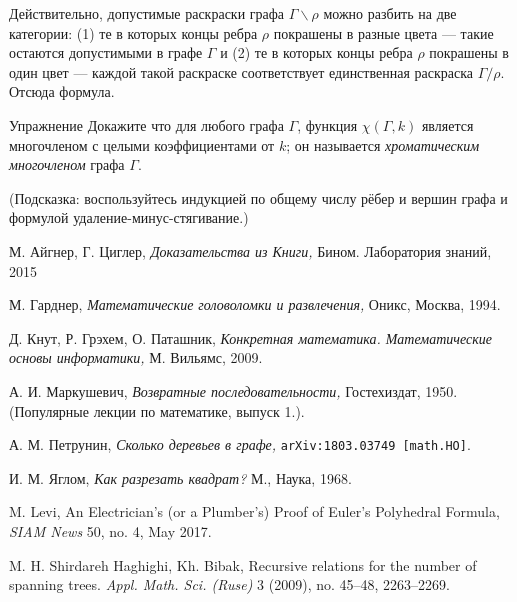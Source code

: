 \documentclass{article}
\begin{document}
Действительно, допустимые раскраски графа $\Gamma\backslash\rho$ можно разбить на две категории: (1) те в которых концы ребра $\rho$ покрашены в разные цвета --- такие остаются допустимыми в графе $\Gamma$ и (2) те в которых концы ребра $\rho$ покрашены в один цвет --- каждой такой раскраске соответствует единственная раскраска $\Gamma/\rho$.
Отсюда формула.

\begin{thm}{Упражнение}
Докажите что для любого графа $\Gamma$, функция $\chi(\Gamma,k)$ является многочленом с целыми коэффициентами от $k$;
он называется \emph{хроматическим многочленом} графа $\Gamma$.

(Подсказка: воспользуйтесь индукцией по общему числу рёбер и вершин графа и формулой удаление-минус-стягивание.)
\end{thm}

\begin{thebibliography}{52}

 М. Айгнер, Г. Циглер, 
\emph{Доказательства из Книги,} 
Бином. Лаборатория знаний, 2015 

 М. Гарднер, \emph{Математические головоломки и развлечения,}  Оникс, Москва, 1994.

Д. Кнут, Р. Грэхем, О. Паташник,
\emph{Конкретная математика. Математические основы информатики,}
М. Вильямс, 
2009.

А. И. Маркушевич,
\emph{Возвратные последовательности,} 
Гостехиздат, 1950. 
(Популярные лекции по математике, выпуск 1.).

 А. М. Петрунин,
\emph{Сколько деревьев в графе,}
\texttt{arXiv:1803.03749 [math.HO]}.

И. М. Яглом,
\emph{Как разрезать квадрат?}
М., Наука, 1968.

 M. Levi,
An Electrician’s (or a Plumber’s)
Proof of Euler’s Polyhedral Formula,
\emph{SIAM News} 50, no. 4, May 2017.


 M. H. Shirdareh Haghighi, Kh. Bibak, 
Recursive relations for the number of spanning trees. 
\emph{Appl. Math. Sci. (Ruse)} 3 (2009), no. 45--48, 2263--2269. 
\end{thebibliography}
\end{document}
